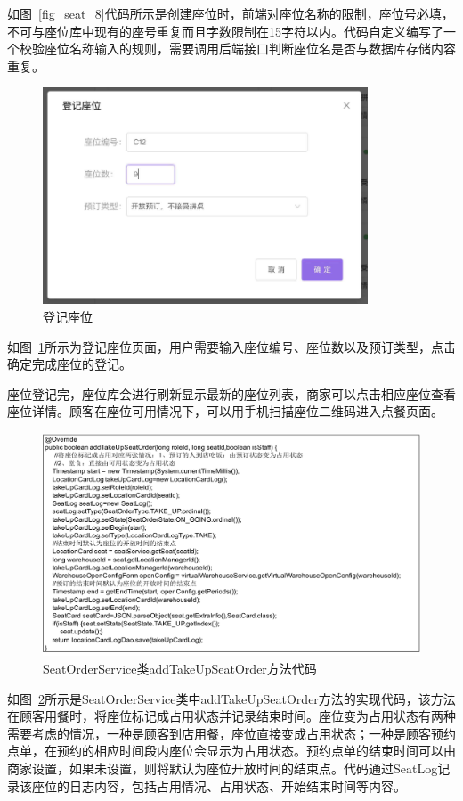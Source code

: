 如图~\ref{fig_seat_8}代码所示是创建座位时，前端对座位名称的限制，座位号必填，不可与座位库中现有的座号重复而且字数限制在15字符以内。代码自定义编写了一个校验座位名称输入的规则，需要调用后端接口判断座位名是否与数据库存储内容重复。

\begin{figure}[htbp!]
    \centering
    \includegraphics[width=3.8in]{FIGs/chapter4/seat_add.pdf}
    \caption{登记座位}\label{fig_seat_add}
\end{figure}

如图~\ref{fig_seat_add}所示为登记座位页面，用户需要输入座位编号、座位数以及预订类型，点击确定完成座位的登记。

座位登记完，座位库会进行刷新显示最新的座位列表，商家可以点击相应座位查看座位详情。顾客在座位可用情况下，可以用手机扫描座位二维码进入点餐页面。

\begin{figure}[htbp!]
    \centering
    \includegraphics[width=\linewidth]{FIGs/chapter4/9.pdf}
    \caption{SeatOrderService类addTakeUpSeatOrder方法代码}\label{fig_seat_9}
\end{figure}

如图~\ref{fig_seat_9}所示是SeatOrderService类中addTakeUpSeatOrder方法的实现代码，该方法在顾客用餐时，将座位标记成占用状态并记录结束时间。座位变为占用状态有两种需要考虑的情况，一种是顾客到店用餐，座位直接变成占用状态；一种是顾客预约点单，在预约的相应时间段内座位会显示为占用状态。预约点单的结束时间可以由商家设置，如果未设置，则将默认为座位开放时间的结束点。代码通过SeatLog记录该座位的日志内容，包括占用情况、占用状态、开始结束时间等内容。

